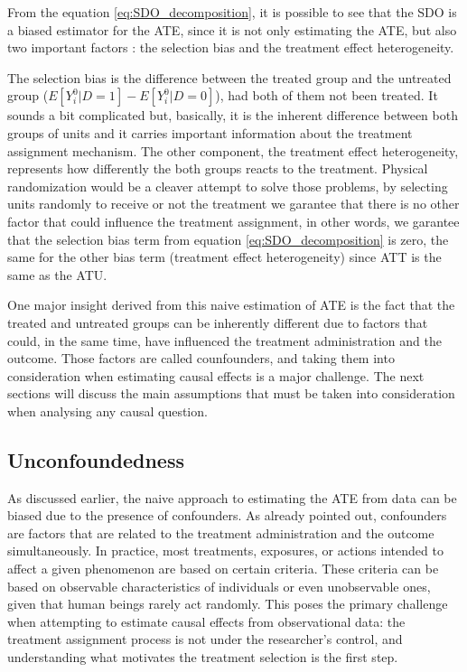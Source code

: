 From the equation \ref{eq:SDO_decomposition}, it is possible to see that the \gls{SDO} is a biased estimator for the \gls{ATE}, since it is not only 
estimating the \gls{ATE}, but also two important factors : the selection bias and the treatment effect heterogeneity. 

The selection bias is the difference
between the treated group and the untreated group ($E[Y_i^0 | D = 1] - E[Y_i^0 | D = 0]$), had both of them not been treated. It sounds a bit complicated but,
basically, it is the inherent difference between both groups of units and it carries important information about the treatment assignment mechanism. The
other component, the treatment effect heterogeneity, represents how differently the both groups reacts to the treatment. Physical randomization would be a cleaver
attempt to solve those problems, by selecting units randomly to receive or not the treatment we garantee that there is no other factor that could influence the treatment
assignment, in other words, we garantee that the selection bias term from equation \ref{eq:SDO_decomposition} is zero, the same for the other bias term (treatment effect 
heterogeneity) since \gls{ATT} is the same as the \gls{ATU}.

One major insight derived from this naive estimation of \gls{ATE} is the fact that the treated and untreated groups can be inherently different due to factors that could, in the same time,
have  influenced the treatment administration and the outcome. Those factors are called counfounders, and taking them into consideration when estimating causal effects is a major challenge. 
The next sections will discuss the main assumptions that must be taken into consideration when analysing any causal question.

\subsection{Unconfoundedness}
\label{sub:uncounfoundedness}

As discussed earlier, the naive approach to estimating the \gls{ATE} from data can be biased due to the presence of confounders. As already pointed out, confounders are factors that are related to the treatment administration 
and the outcome simultaneously. In practice, most treatments, exposures, or actions intended to affect a given phenomenon are based on certain criteria. These criteria can be based on observable characteristics of 
individuals or even unobservable ones, given that human beings rarely act randomly. This poses the primary challenge when attempting to estimate causal effects from observational data: the treatment assignment 
process is not under the researcher's control, and understanding what motivates the treatment selection is the first step.

